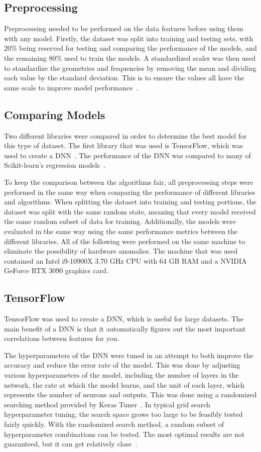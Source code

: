 \documentclass[conference]{IEEEtran}
\begin{document}
\subsection{Preprocessing}
Preprocessing needed to be performed on the data features before using them with any model. Firstly, the dataset was split into training and testing sets, with 20\% being reserved for testing and comparing the performance of the models, and the remaining 80\% used to train the models. A standardized scaler was then used to standardize the geometries and frequencies by removing the mean and dividing each value by the standard deviation. This is to ensure the values all have the same scale to improve model performance~\cite{9119820}. 


\subsection{Comparing Models}
Two different libraries were compared in order to determine the best model for this type of dataset. The first library that was used is TensorFlow, which was used to create a DNN~\cite{tensorflow2015-whitepaper}. The performance of the DNN was compared to many of Scikit-learn's regression models~\cite{scikit-learn}.

To keep the comparison between the algorithms fair, all preprocessing steps were performed in the same way when comparing the performance of different libraries and algorithms. When splitting the dataset into training and testing portions, the dataset was split with the same random state, meaning that every model received the same random subset of data for training. Additionally, the models were evaluated in the same way using the same performance metrics between the different libraries. All of the following were performed on the same machine to eliminate the possibility of hardware anomalies. The machine that was used contained an Intel i9-10900X 3.70 GHz CPU with 64 GB RAM and a NVIDIA GeForce RTX 3090 graphics card. 


\subsection{TensorFlow}
TensorFlow was used to create a DNN, which is useful for large datasets. The main benefit of a DNN is that it automatically figures out the most important correlations between features for you. 

The hyperparameters of the DNN were tuned in an attempt to both improve the accuracy and reduce the error rate of the model. This was done by adjusting various hyperparameters of the model, including the number of layers in the network, the rate at which the model learns, and the unit of each layer, which represents the number of neurons and outputs. This was done using a randomized searching method provided by Keras Tuner~\cite{omalley2019kerastuner}. In typical grid search hyperparameter tuning, the search space grows too large to be feasibly tested fairly quickly. With the randomized search method, a random subset of hyperparameter combinations can be tested. The most optimal results are not guaranteed, but it can get relatively close~\cite{meanti_efficient_2022}. 
\end{document}
